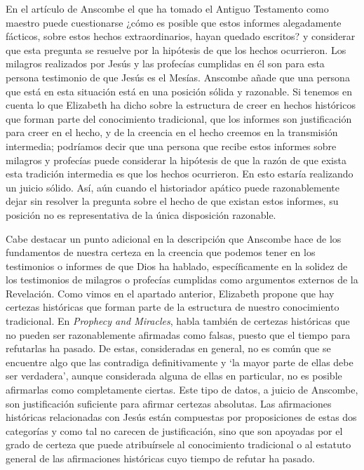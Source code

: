 En el artículo de Anscombe el que ha tomado el Antiguo Testamento como maestro puede cuestionarse ¿cómo es posible que estos informes alegadamente fácticos, sobre estos hechos extraordinarios, hayan quedado escritos? y considerar que esta pregunta se resuelve por la hipótesis de que los hechos ocurrieron. Los milagros realizados por Jesús y las profecías cumplidas en él son para esta persona testimonio de que Jesús es el Mesías. Anscombe añade que una persona que está en esta situación está en una posición sólida y razonable. Si tenemos en cuenta lo que Elizabeth ha dicho sobre la estructura de creer en hechos históricos que forman parte del conocimiento tradicional, que los informes son justificación para creer en el hecho, y de la creencia en el hecho creemos en la transmisión intermedia; podríamos decir que una persona que recibe estos informes sobre milagros y profecías puede considerar la hipótesis de que la razón de que exista esta tradición intermedia es que los hechos ocurrieron. En esto estaría realizando un juicio sólido. Así, aún cuando el historiador apático puede razonablemente dejar sin resolver la pregunta sobre el hecho de que existan estos informes, su posición no es representativa de la única disposición razonable.

Cabe destacar un punto adicional en la descripción que Anscombe hace de los fundamentos de nuestra certeza en la creencia que podemos tener en los testimonios o informes de que Dios ha hablado, específicamente en la solidez de los testimonios de milagros o profecías cumplidas como argumentos externos de la Revelación. Como vimos en el apartado anterior, Elizabeth propone que hay certezas históricas que forman parte de la estructura de nuestro conocimiento tradicional. En \emph{Prophecy and Miracles}, habla también de certezas históricas que no pueden ser razonablemente afirmadas como falsas, puesto que el tiempo para refutarlas ha pasado. De estas, consideradas en general, no es común que se encuentre algo que las contradiga definitivamente y \enquote*{la mayor parte de ellas debe ser verdadera}, aunque considerada alguna de ellas en particular, no es posible afirmarlas como completamente ciertas. Este tipo de datos, a juicio de Anscombe, son justificación suficiente para afirmar certezas absolutas. Las afirmaciones históricas relacionadas con Jesús están compuestas por proposiciones de estas dos categorías y como tal no carecen de justificación, sino que son apoyadas por el grado de certeza que puede atribuírsele al conocimiento tradicional o al estatuto general de las afirmaciones históricas cuyo tiempo de refutar ha pasado.

